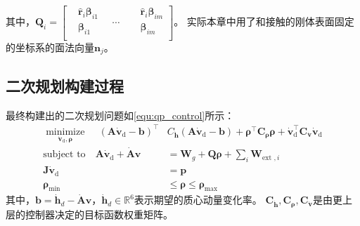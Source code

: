 其中，${{\boldsymbol{Q}}_{i}}=\left[ \begin{aligned}
    & {{{\hat{\boldsymbol{r}}}}_{i}}{{\boldsymbol{\beta}}_{i1}} \\ 
   & {{\boldsymbol{\beta}}_{i1}}\ \ \ \  \\ 
  \end{aligned} \right.\ \ \ \ \cdots \ \ \ \ \left. \begin{aligned}
    & {{{\hat{\boldsymbol{r}}}}_{i}}{{\boldsymbol{\beta}}_{im}} \\ 
   & {{\boldsymbol{\beta}}_{im}} \\ 
  \end{aligned} \right]
  $。
  实际本章中用了和接触的刚体表面固定的坐标系的面法向量${{\boldsymbol{n}}_{j}}$。
\subsection{二次规划构建过程}
最终构建出的二次规划问题如\ref{equ:qp_control}所示：
\begin{equation}
    \label{equ:qp_control}
    \begin{aligned}
       \underset{{{{\dot{\boldsymbol{v}}}}_{\text{d}}},\boldsymbol{\rho}}{\mathop{\operatorname{minimize}}}\,\quad {{\left( \boldsymbol{A}{{{\dot{\boldsymbol{v}}}}_{\text{d}}}-\boldsymbol{b} \right)}^{\top }}&{{C}_{{\dot{\boldsymbol{h}}}}}\left( \boldsymbol{A}{{{\dot{\boldsymbol{v}}}}_{\text{d}}}-\boldsymbol{b} \right)+{{\boldsymbol{\rho} }^{\top }}{{\boldsymbol{C}}_{\boldsymbol{\rho} }}\boldsymbol{\rho} +\dot{\boldsymbol{v}}_{\text{d}}^{\top }{{\boldsymbol{C}}_{{\dot{\boldsymbol{v}}}}}{{{\dot{\boldsymbol{v}}}}_{\text{d}}} \\ 
        \text{subject to}\quad \boldsymbol{A}{{{\dot{\boldsymbol{v}}}}_{\text{d}}}+\dot{\boldsymbol{A}}\boldsymbol{v}&={\boldsymbol{{}W}_{g}}+\boldsymbol{Q}\boldsymbol{\rho} +\sum\limits_{i}{{{\boldsymbol{W}}_{\text{ext },i}}} \\ 
        \boldsymbol{J}{{{\dot{\boldsymbol{v}}}}_{\text{d}}}&=\boldsymbol{p} \\ 
        {{\boldsymbol{\rho} }_{\min }}&\le \boldsymbol{\rho} \le {{\boldsymbol{\rho} }_{\max }} 
      \end{aligned}
\end{equation}
其中，$\boldsymbol{b}={{\dot{\boldsymbol{h}}}_{d}}-\dot{\boldsymbol{A}}\boldsymbol{v}$，${{\dot{\boldsymbol{h}}}_{d}}\in {{\mathbb{R}}^{6}}$表示期望的质心动量变化率。
${{\boldsymbol{C}}_{{\dot{\boldsymbol{h}}}}},{\boldsymbol{{C}}_{\boldsymbol{\rho} }},{\boldsymbol{C}_{{\dot{\boldsymbol{v}}}}}$是由更上层的控制器决定的目标函数权重矩阵。

